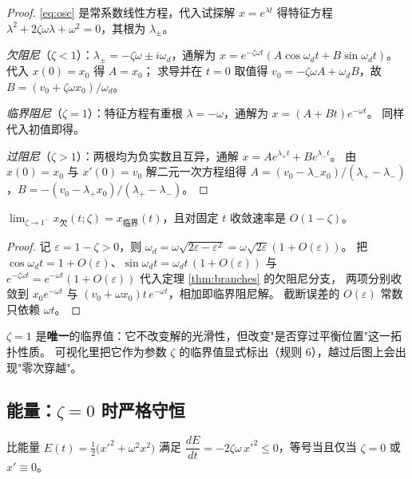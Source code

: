 \begin{proof}
\eqref{eq:osc} 是常系数线性方程，代入试探解 $x=e^{\lambda t}$ 得特征方程
$\lambda^2+2\zeta\omega\lambda+\omega^2=0$，其根为 $\lambda_\pm$。

\emph{欠阻尼}（$\zeta<1$）：$\lambda_\pm=-\zeta\omega\pm i\omega_d$，通解为
$x=e^{-\zeta\omega t}(A\cos\omega_d t+B\sin\omega_d t)$。代入 $x(0)=x_0$ 得 $A=x_0$；
求导并在 $t=0$ 取值得 $v_0=-\zeta\omega A+\omega_d B$，故 $B=(v_0+\zeta\omega x_0)/\omega_d$。

\emph{临界阻尼}（$\zeta=1$）：特征方程有重根 $\lambda=-\omega$，通解为 $x=(A+Bt)e^{-\omega t}$。
同样代入初值即得。

\emph{过阻尼}（$\zeta>1$）：两根均为负实数且互异，通解 $x=Ae^{\lambda_+t}+Be^{\lambda_-t}$。
由 $x(0)=x_0$ 与 $x'(0)=v_0$ 解二元一次方程组得
$A=(v_0-\lambda_-x_0)/(\lambda_+-\lambda_-)$，$B=-(v_0-\lambda_+x_0)/(\lambda_+-\lambda_-)$。
\end{proof}

\begin{corollary}[临界阻尼是欠阻尼的极限]
$\lim_{\zeta\to1^-} x_{\text{欠}}(t;\zeta) = x_{\text{临界}}(t)$，且对固定 $t$ 收敛速率是 $O(1-\zeta)$。
\end{corollary}

\begin{proof}
记 $\varepsilon=1-\zeta>0$，则 $\omega_d=\omega\sqrt{2\varepsilon-\varepsilon^2}=\omega\sqrt{2\varepsilon}(1+O(\varepsilon))$。
把 $\cos\omega_d t=1+O(\varepsilon)$、$\sin\omega_d t=\omega_d t\,(1+O(\varepsilon))$ 与
$e^{-\zeta\omega t}=e^{-\omega t}(1+O(\varepsilon))$ 代入定理 \ref{thm:branches} 的欠阻尼分支，
两项分别收敛到 $x_0e^{-\omega t}$ 与 $(v_0+\omega x_0)t\,e^{-\omega t}$，相加即临界阻尼解。
截断误差的 $O(\varepsilon)$ 常数只依赖 $\omega t$。
\end{proof}

\begin{remark}
$\zeta=1$ 是\textbf{唯一}的临界值：它不改变解的光滑性，但改变"是否穿过平衡位置"这一拓扑性质。
可视化里把它作为参数 $\zeta$ 的临界值显式标出（规则 6），越过后图上会出现"零次穿越"。
\end{remark}

\subsection{能量：$\zeta=0$ 时严格守恒}

\begin{theorem}[能量单调性]
\label{thm:energy}
比能量 $E(t)=\tfrac12\bigl(x'^2+\omega^2x^2\bigr)$ 满足
$\dfrac{dE}{dt}=-2\zeta\omega\,x'^2\le 0$，等号当且仅当 $\zeta=0$ 或 $x'\equiv0$。
\end{theorem}

